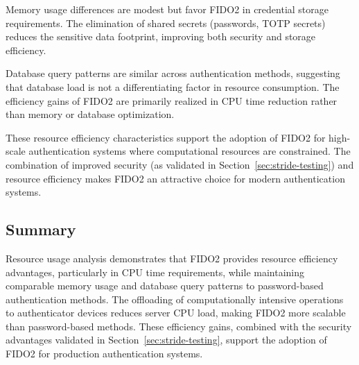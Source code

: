 Memory usage differences are modest but favor FIDO2 in credential storage requirements. The elimination of shared secrets (passwords, TOTP secrets) reduces the sensitive data footprint, improving both security and storage efficiency.

Database query patterns are similar across authentication methods, suggesting that database load is not a differentiating factor in resource consumption. The efficiency gains of FIDO2 are primarily realized in CPU time reduction rather than memory or database optimization.

These resource efficiency characteristics support the adoption of FIDO2 for high-scale authentication systems where computational resources are constrained. The combination of improved security (as validated in Section~\ref{sec:stride-testing}) and resource efficiency makes FIDO2 an attractive choice for modern authentication systems.

\subsection{Summary}

Resource usage analysis demonstrates that FIDO2 provides resource efficiency advantages, particularly in CPU time requirements, while maintaining comparable memory usage and database query patterns to password-based authentication methods. The offloading of computationally intensive operations to authenticator devices reduces server CPU load, making FIDO2 more scalable than password-based methods. These efficiency gains, combined with the security advantages validated in Section~\ref{sec:stride-testing}, support the adoption of FIDO2 for production authentication systems.

